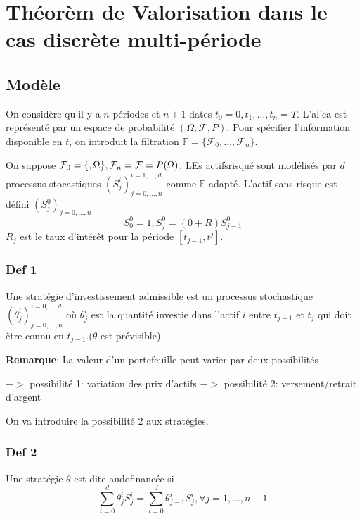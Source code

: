 \documentclass{article}
\begin{document}
\section{Th\'eor\`em de Valorisation dans le cas discr\`ete multi-p\'eriode}
\subsection{Mod\`ele}
On consid\`ere qu'il y a $n$ p\'eriodes et $n+1$ dates ${t_0=0,t_1,\ldots,t_n=T}$. L'al'ea est repr\'esent\'e par un espace de probabilit\'e $(\Omega,\mathcal{F},P)$. Pour sp\'ecifier l'information disponible en $t$, on introduit la filtration $\mathbb{F}=\{\mathcal{F}_0,\ldots,\mathcal{F}_n\}$. 

On suppose $\mathcal{F}_0=\{\empty,\Omega\},\mathcal{F}_n=\mathcal{F}=P(\Omega)$. LEs actifsrisqu\'e sont mod\'elis\'es par $d$ processus stocastiques $(S^i_j)_{j=0,\ldots,n}^{i=1,\ldots,d}$ comme $\mathbb{F}$-adapt\'e. L'actif sans risque est d\'efini $(S_j^0)_{j=0,\ldots,n}$
\begin{equation}
S_0^0=1,S_j^0=(0+R)S_{j-1}^0
\end{equation} 
$R_j$ est le taux d'int\'er\^et pour la p\'eriode $[t_{j-1},t^j]$.

\subsubsection{Def 1}
Une strat\'egie d'investissement admissible est un processus stochastique $(\theta_j^i)_{j=0,\ldots,n}^{i=0,\ldots,d}$ o\`u $\theta_j^i$ est la quantit\'e investie dans l'actif $i$ entre $t_{j-1}$ et $t_j$ qui doit \^etre connu en $t_{j-1}$.($\theta$ est pr\'evisible).

\textbf{Remarque}:
La valeur d'un portefeuille peut varier par deux possibilit\'es

$->$ possibilit\'e 1: variation des prix d'actifs
$->$ possibilit\'e 2: versement/retrait d'argent

On va introduire la possibilit\'e 2 aux strat\'egies. 

\subsubsection{Def 2}
Une strat\'egie $\theta$ est dite audofinanc\'ee si 
\begin{equation}
\sum_{i=0}^d\theta_j^i S_j^i=\sum_{i=0}^d\theta_{j-1}^i S_j^i, \forall j=1,\ldots,n-1
\end{equation}
\end{document}
